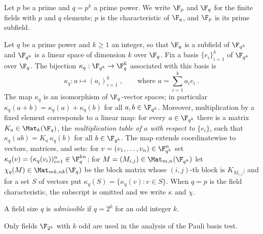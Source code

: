 Let $p$ be a prime and $q = p^k$ a prime power. We write $\F_p$ and $\F_q$ for
the finite fields with $p$ and $q$ elements; $p$ is the characteristic of
$\F_q$, and $\F_p$ is its prime subfield.

\begin{definition}\label{def:subfields-kappa}
	\leanok
	Let $q$ be a prime power and $k \ge 1$ an integer, so that $\F_q$ is a
	subfield of $\F_{q^k}$ and $\F_{q^k}$ is a linear space of dimension $k$
	over $\F_q$.
	Fix a basis $\{e_i\}_{i=1}^k$ of $\F_{q^k}$ over $\F_q$. The bijection
	$\kappa_q : \F_{q^k} \to \F_q^k$ associated with this basis is
	\[
		\kappa_q : a \mapsto (a_i)_{i=1}^k\;, \qquad
		\text{where } a = \sum_{i=1}^k a_i e_i\;.
	\]
	The map $\kappa_q$ is an isomorphism of $\F_q$-vector spaces; in particular
	$\kappa_q(a + b) = \kappa_q(a) + \kappa_q(b)$ for all $a, b \in \F_{q^k}$.
	Moreover, multiplication by a fixed element corresponds to a linear map:
	for every $a \in \F_{q^k}$ there is a matrix $K_a \in \Mat_k(\F_q)$, the
	\emph{multiplication table of $a$ with respect to $\{e_i\}$}, such that
	$\kappa_q(ab) = K_a\, \kappa_q(b)$ for all $b \in \F_{q^k}$.
	The map extends coordinatewise to vectors, matrices, and sets: for
	$v = (v_1, \dots, v_n) \in \F_{q^k}^n$ set
	$\kappa_q(v) = (\kappa_q(v_i))_{i=1}^n \in \F_q^{kn}$; for
	$M = (M_{i,j}) \in \Mat_{m,n}(\F_{q^k})$ let
	$\chi_q(M) \in \Mat_{mk,nk}(\F_q)$ be the block matrix whose $(i,j)$-th
	block is $K_{M_{i,j}}$; and for a set $S$ of vectors put
	$\kappa_q(S) = \{\kappa_q(v) : v \in S\}$. When $q = p$ is the field
	characteristic, the subscript is omitted and we write $\kappa$ and $\chi$.
\end{definition}

\begin{definition}\label{def:admissible-size}
	\leanok
	A field size $q$ is \emph{admissible} if $q = 2^k$ for an odd integer $k$.
\end{definition}

Only fields $\F_{2^k}$ with $k$ odd are used in the analysis of the Pauli basis
test.

